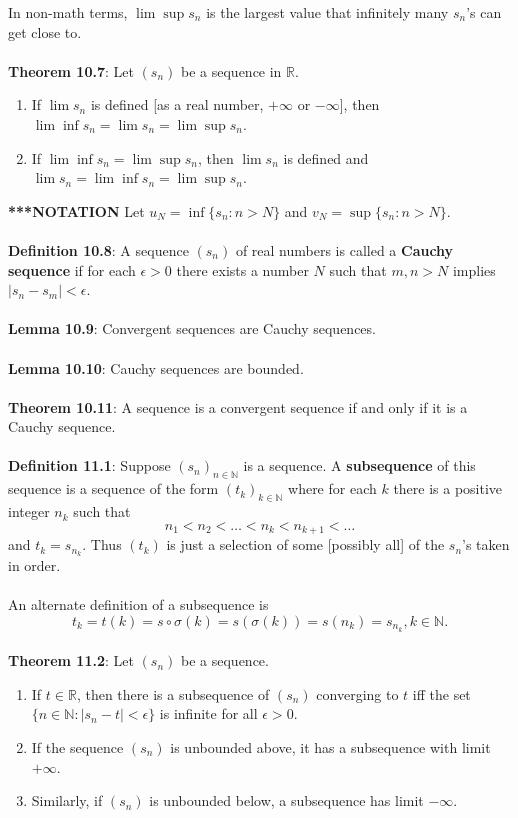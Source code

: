 \documentclass{article}
\theoremstyle{definition}
\DeclareMathOperator{\Inf}{inf}
\DeclareMathOperator{\Sup}{sup}
\begin{document}
In non-math terms, $\lim{\Sup{s_n}}$ is the largest value that infinitely many $s_n$’s can get close to. \\ \\
\textbf{Theorem 10.7}: Let $(s_n)$ be a sequence in $\mathbb{R}$. \begin{enumerate}
    \item If $\lim s_n$ is defined [as a real number, $+\infty$ or $-\infty$], then $\lim{\Inf{s_n}} = \lim s_n = \lim{\Sup{s_n}}$.
    \item If $\lim{\Inf{s_n}} = \lim{\Sup{s_n}}$, then $\lim s_n$ is defined and $\lim s_n = \lim{\Inf{s_n}} = \lim{\Sup{s_n}}$.
\end{enumerate} $ $ \\
\textbf{***NOTATION} Let $u_N = \Inf\{s_n : n > N\}$ and $v_N = \Sup\{s_n : n > N\}$. \\ \\
\textbf{Definition 10.8}: A sequence $(s_n)$ of real numbers is called a \textbf{Cauchy sequence} if for each $\epsilon > 0$ there exists a number $N$ such that $m, n > N$ implies $|s_n - s_m| < \epsilon$. \\ \\
\textbf{Lemma 10.9}: Convergent sequences are Cauchy sequences. \\ \\
\textbf{Lemma 10.10}: Cauchy sequences are bounded. \\ \\
\textbf{Theorem 10.11}: A sequence is a convergent sequence if and only if it is a Cauchy sequence. \\ \\
\textbf{Definition 11.1}: Suppose $(s_n)_{n \in \mathbb{N}}$ is a sequence. A \textbf{subsequence} of this sequence is a sequence of the form $(t_k)_{k \in \mathbb{N}}$ where for each $k$ there is a positive
integer $n_k$ such that $$n_1 < n_2 < \dots < n_k < n_{k + 1} < \dots$$
and $t_k = s_{n_k}$. Thus $(t_k)$ is just a selection of some [possibly all] of the $s_n$’s taken in order. \\ \\
An alternate definition of a subsequence is $$t_k = t(k) = s \circ \sigma(k) = s(\sigma(k)) = s(n_k) = s_{n_k}, k \in \mathbb{N}.$$ \\
\textbf{Theorem 11.2}: Let $(s_n)$ be a sequence. \begin{enumerate}
    \item If $t \in \mathbb{R}$, then there is a subsequence of $(s_n)$ converging to $t$ iff the set $\{n \in \mathbb{N} : |s_n - t| < \epsilon \}$ is infinite for all $\epsilon > 0$.
    \item If the sequence $(s_n)$ is unbounded above, it has a subsequence with limit $+\infty$.
    \item Similarly, if $(s_n)$ is unbounded below, a subsequence has limit $-\infty$.
\end{enumerate}
\end{document}
